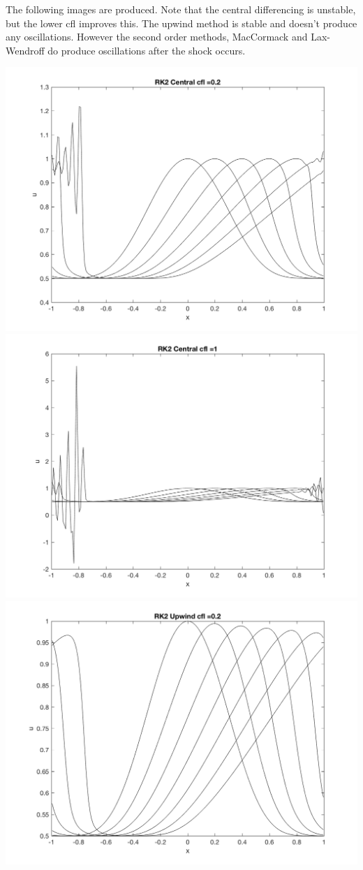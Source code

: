 \documentclass[11pt, oneside]{article}
\begin{document}
\begin{enumerate}
    The following images are produced.
    Note that the central differencing is unstable, but the lower cfl
    improves this.
    The upwind method is stable and doesn't produce any oscillations.
    However the second order methods, MacCormack and Lax-Wendroff do produce
    oscillations after the shock occurs.
    \begin{center}
      \includegraphics[scale=0.5]{Figures/08_05.png}
      \includegraphics[scale=0.5]{Figures/08_06.png}
      \includegraphics[scale=0.5]{Figures/08_07.png}

\end{center}
\end{enumerate}
\end{document}
